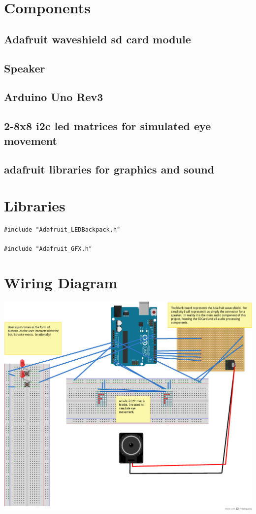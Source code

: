 \documentclass[a4paper,6pt]{article}
\begin{document}
\section{Components}
\label{sec-2}
\subsection{Adafruit waveshield sd card module}
\label{sec-2-1}
\subsection{Speaker}
\label{sec-2-2}
\subsection{Arduino Uno Rev3}
\label{sec-2-3}
\subsection{2-8x8 i2c led matrices for simulated eye movement}
\label{sec-2-4}
\subsection{adafruit libraries for graphics and sound}
\label{sec-2-5}
\section{Libraries}
\label{sec-3}
\begin{verbatim}
#include "Adafruit_LEDBackpack.h"

#include "Adafruit_GFX.h"
\end{verbatim}

\section{Wiring Diagram}
\label{sec-4}
\includegraphics[angle=0,width=16cm]{./talk_a_lot_fritz_bb.png}
\end{document}
